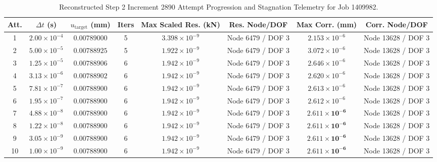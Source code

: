 \begin{table}[htbp]
\centering
\small
\caption{Reconstructed Step 2 Increment 2890 Attempt Progression and Stagnation Telemetry for Job 1409982.}
\label{tab:stage14uag_attempt_sequence}
\begin{tabularx}{\textwidth}{c c c c c c c c}
\toprule
\textbf{Att.} & $\Delta t$ (s) & $u_{\mathrm{target}}$ (mm) & \textbf{Iters} & \textbf{Max Scaled Res.} (kN) & \textbf{Res. Node/DOF} & \textbf{Max Corr.} (mm) & \textbf{Corr. Node/DOF} \\
\midrule
1 & $2.00\times 10^{-4}$ & $0.00789000$ & 5 & $3.398\times 10^{-9}$ & Node 6479 / DOF 3 & $2.153\times 10^{-6}$ & Node 13628 / DOF 3 \\
2 & $5.00\times 10^{-5}$ & $0.00788925$ & 5 & $1.922\times 10^{-9}$ & Node 6479 / DOF 3 & $3.072\times 10^{-6}$ & Node 13628 / DOF 3 \\
3 & $1.25\times 10^{-5}$ & $0.00788906$ & 6 & $1.942\times 10^{-9}$ & Node 6479 / DOF 3 & $2.646\times 10^{-6}$ & Node 13628 / DOF 3 \\
4 & $3.13\times 10^{-6}$ & $0.00788902$ & 6 & $1.942\times 10^{-9}$ & Node 6479 / DOF 3 & $2.620\times 10^{-6}$ & Node 13628 / DOF 3 \\
5 & $7.81\times 10^{-7}$ & $0.00788900$ & 6 & $1.942\times 10^{-9}$ & Node 6479 / DOF 3 & $2.613\times 10^{-6}$ & Node 13628 / DOF 3 \\
6 & $1.95\times 10^{-7}$ & $0.00788900$ & 6 & $1.942\times 10^{-9}$ & Node 6479 / DOF 3 & $2.612\times 10^{-6}$ & Node 13628 / DOF 3 \\
7 & $4.88\times 10^{-8}$ & $0.00788900$ & 6 & $1.942\times 10^{-9}$ & Node 6479 / DOF 3 & $\mathbf{2.611\times 10^{-6}}$ & Node 13628 / DOF 3 \\
8 & $1.22\times 10^{-8}$ & $0.00788900$ & 6 & $1.942\times 10^{-9}$ & Node 6479 / DOF 3 & $\mathbf{2.611\times 10^{-6}}$ & Node 13628 / DOF 3 \\
9 & $3.05\times 10^{-9}$ & $0.00788900$ & 6 & $1.942\times 10^{-9}$ & Node 6479 / DOF 3 & $\mathbf{2.611\times 10^{-6}}$ & Node 13628 / DOF 3 \\
10 & $1.00\times 10^{-9}$ & $0.00788900$ & 6 & $1.942\times 10^{-9}$ & Node 6479 / DOF 3 & $\mathbf{2.611\times 10^{-6}}$ & Node 13628 / DOF 3 \\
\bottomrule
\end{tabularx}
\end{table}

